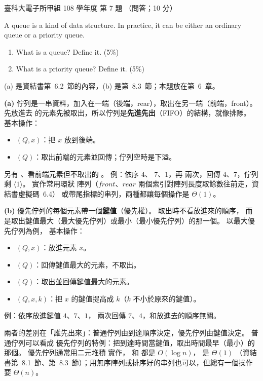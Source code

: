 \begin{pastexam}[label={px:ntust-108-et-dlds-07}]{臺科大電子所甲組 108 學年度 第 7 題}
（問答；10 分）

A queue is a kind of data structure. In practice, it can be either an ordinary queue or a priority
queue.
\begin{enumerate}[label=(\alph*)]
\item What is a queue? Define it. (5\%)
\item What is a priority queue? Define it. (5\%)
\end{enumerate}
\end{pastexam}

\begin{pastsoln}
(a) 是資結書第~6.2~節的內容，(b) 是第~8.3~節；本題放在第~6~章。

\textbf{(a)} 佇列是一串資料，加入在一端（後端，rear），取出在另一端（前端，front）。 先放進去
的元素先被取出，所以佇列是\textbf{先進先出}（FIFO）的結構，就像排隊。 基本操作：
\begin{itemize}
\item {}$(Q, x)$：把 $x$ 放到後端。
\item {}$(Q)$：取出前端的元素並回傳；佇列空時是下溢。
\end{itemize}
另有 、看前端元素但不取出的 。 例：依序  $4$、
$7$、$1$，再  兩次，回傳 $4$、$7$，佇列剩 $\langle 1\rangle$。 實作常用環狀
陣列（$\mathit{front}$、$\mathit{rear}$ 兩個索引對陣列長度取餘數往前走，資結書虛擬碼~6.4）
或帶尾指標的串列，兩種都讓每個操作是 $\Theta(1)$。

\textbf{(b)} 優先佇列的每個元素帶一個\textbf{鍵值}（優先權）。 取出時不看放進來的順序，
而是取出鍵值最大（最大優先佇列）或最小（最小優先佇列）的那一個。 以最大優先佇列為例，
基本操作：
\begin{itemize}
\item {}$(Q, x)$：放進元素 $x$。
\item {}$(Q)$：回傳鍵值最大的元素，不取出。
\item {}$(Q)$：取出並回傳鍵值最大的元素。
\item {}$(Q, x, k)$：把 $x$ 的鍵值提高成 $k$（$k$ 不小於原來的鍵值）。
\end{itemize}
例：依序放進鍵值 $4$、$7$、$1$， 兩次回傳 $7$、$4$，和放進去的順序無關。

兩者的差別在「誰先出來」：普通佇列由到達順序決定，優先佇列由鍵值決定。 普通佇列可以看成
優先佇列的特例：把到達時間當鍵值，取出時間最早（最小）的那個。 優先佇列通常用二元堆積
實作， 和  都是 $O(\log n)$， 是 $\Theta(1)$
（資結書第~8.1~節、第~8.3~節）；用無序陣列或排序好的串列也可以，但總有一個操作要
$\Theta(n)$。
\end{pastsoln}
